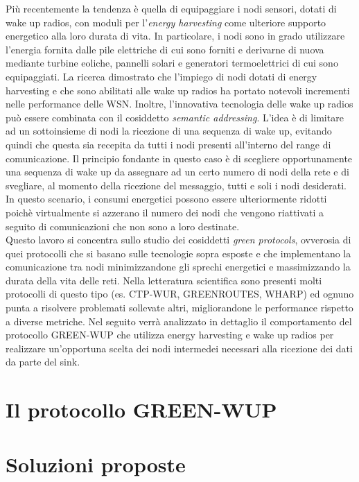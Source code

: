 \documentclass[binding=0.6cm,Lau,noexaminfo]{sapthesis}
\begin{document}
Più recentemente la tendenza è quella di equipaggiare i nodi sensori, dotati di wake up radios, con moduli per l'\emph{energy harvesting} come ulteriore
supporto energetico alla loro durata di vita. In particolare, i nodi sono in grado utilizzare l'energia fornita dalle pile elettriche di cui sono
forniti e derivarne di nuova mediante turbine eoliche, pannelli solari e generatori termoelettrici di cui sono equipaggiati. La ricerca dimostrato che l'impiego
di nodi dotati di energy harvesting \cite{energy-harvesting-paper} e che sono abilitati alle wake up radios \cite{wake-up-radios-paper} ha portato notevoli
incrementi nelle performance delle WSN. Inoltre, l'innovativa tecnologia delle wake up radios può essere combinata con il cosiddetto \emph{semantic addressing}.
L'idea è di limitare ad un sottoinsieme di nodi la ricezione di una sequenza di wake up, evitando quindi che questa sia recepita da tutti i nodi presenti all'interno
del range di comunicazione. Il principio fondante in questo caso è di scegliere
opportunamente una sequenza di wake up da assegnare ad un certo numero di nodi della rete e di svegliare, al momento della ricezione del messaggio, tutti e soli i
nodi desiderati. In questo scenario, i consumi energetici possono essere ulteriormente ridotti poichè virtualmente si azzerano il numero dei nodi che vengono
riattivati a seguito di comunicazioni che non sono a loro destinate.\\

Questo lavoro si concentra sullo studio dei cosiddetti \emph{green protocols}, ovverosia di quei protocolli che si basano sulle tecnologie sopra esposte
e che implementano la comunicazione tra nodi minimizzandone gli sprechi energetici e massimizzando la durata della vita delle reti. Nella letteratura scientifica
sono presenti molti protocolli di questo tipo (es. CTP-WUR, GREENROUTES, WHARP) ed ognuno punta a risolvere problemati sollevate altri, migliorandone le performance
rispetto a diverse metriche. Nel seguito verrà analizzato in dettaglio il comportamento del protocollo GREEN-WUP che utilizza energy harvesting e
wake up radios per realizzare un'opportuna scelta dei nodi intermedei necessari alla ricezione dei dati da parte del sink.\\

\chapter{Il protocollo GREEN-WUP}
\chapter{Soluzioni proposte}
\end{document}
